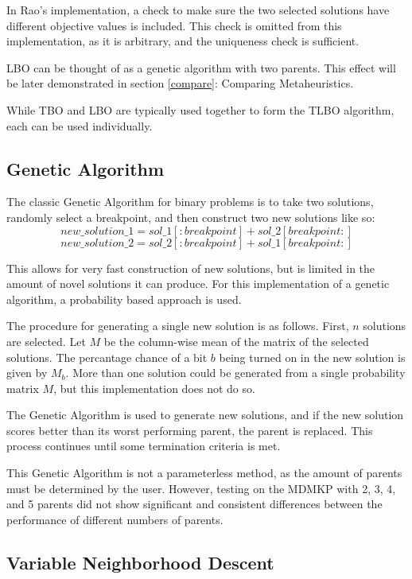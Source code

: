 \documentclass[11pt, letterpaper, onecolumn]{article}
\begin{document}
In Rao's implementation, a check to make sure the two selected solutions have different objective values is included. This check is omitted from this implementation, as it is arbitrary, and the uniqueness check is sufficient. 

LBO can be thought of as a genetic algorithm with two parents. This effect will be later demonstrated in section \ref{compare}: Comparing Metaheuristics.

While TBO and LBO are typically used together to form the TLBO algorithm, each can be used individually. 

\clearpage 
\subsection{Genetic Algorithm}

The classic Genetic Algorithm for binary problems is to take two solutions, randomly select a breakpoint, and then construct two new solutions like so:
\begin{equation}
new\_solution\_1 = sol\_1[:breakpoint] + sol\_2[breakpoint:]
\end{equation}
$$ new\_solution\_2 = sol\_2[:breakpoint] + sol\_1[breakpoint:] $$

This allows for very fast construction of new solutions, but is limited in the amount of novel solutions it can produce. For this implementation of a genetic algorithm, a probability based approach is used. 

The procedure for generating a single new solution is as follows. First, $n$ solutions are selected. Let $M$ be the column-wise mean of the matrix of the selected solutions. The percantage chance of a bit $b$ being turned on in the new solution is given by $M_b$. More than one solution could be generated from a single probability matrix $M$, but this implementation does not do so. 

The Genetic Algorithm is used to generate new solutions, and if the new solution scores better than its worst performing parent, the parent is replaced. This process continues until some termination criteria is met. 

This Genetic Algorithm is not a parameterless method, as the amount of parents must be determined by the user. However, testing on the MDMKP with 2, 3, 4, and 5 parents did not show significant and consistent differences between the performance of different numbers of parents. 

\subsection{Variable Neighborhood Descent}
\end{document}
